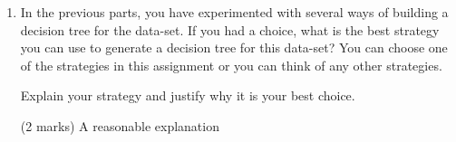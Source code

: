 \documentclass[12pt]{article}
\begin{document}
\begin{enumerate}[(a)]
\begin{enumerate}[(1)]
\begin{markscheme}
(1 mark) Correct value of the best minimum number of examples for post-pruning.
\end{markscheme}


\item 
In the previous parts, you have experimented with several ways of building a decision tree for the data-set. If you had a choice, what is the best strategy you can use to generate a decision tree for this data-set? You can choose one of the strategies in this assignment or you can think of any other strategies. 

Explain your strategy and justify why it is your best choice.
\begin{markscheme}

(2 marks) A reasonable explanation
\end{markscheme}


\end{enumerate}

\end{enumerate}
\end{document}
